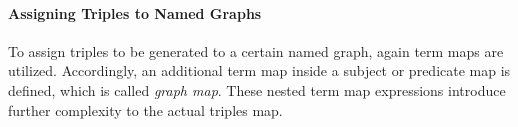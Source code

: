


\paragraph{Assigning Triples to Named Graphs}
To assign triples to be generated to a certain named graph, again term maps are utilized.
Accordingly, an additional term map inside a subject or predicate map is defined, which is called \emph{graph map}.
These nested term map expressions introduce further complexity to the actual triples map.

%





